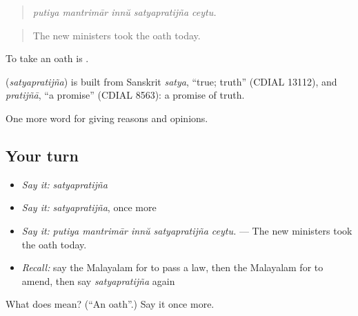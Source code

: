 \begin{quote}
\emph{putiya mantrimār innŭ satyapratijña ceytu.}
\end{quote}

\begin{quote}
The new ministers took the oath today.
\end{quote}

To take an oath is  .

\begin{cousinweb}
\textbf{} (\emph{satyapratijña}) is built from Sanskrit \emph{satya}, \textquotedblleft{}true; truth\textquotedblright{} (CDIAL 13112), and \emph{pratijñā}, \textquotedblleft{}a promise\textquotedblright{} (CDIAL 8563): a promise of truth.
\end{cousinweb}

\begin{grammarlens}[title={What you've built}]
One more word for giving reasons and opinions.
\end{grammarlens}

\subsection*{Your turn}
\begin{itemize}
\raggedright
  \item \emph{Say it:} \emph{satyapratijña}
  \item \emph{Say it:} \emph{satyapratijña}, once more
  \item \emph{Say it:} \emph{putiya mantrimār innŭ satyapratijña ceytu.} — The new ministers took the oath today.
  \item \emph{Recall:} say the Malayalam for to pass a law, then the Malayalam for to amend, then say \emph{satyapratijña} again
\end{itemize}

\begin{tcolorbox}[breakable,colback=teal!4,colframe=teal!35!black,title={Before you move on}]
What does  mean? (\textquotedblleft{}An oath\textquotedblright{}.) Say it once more.
\end{tcolorbox}
